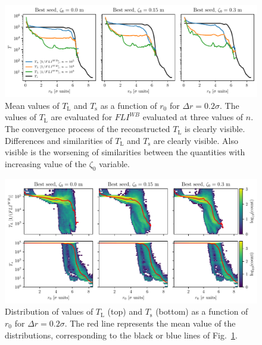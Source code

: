 \begin{figure}
    \centering
    \includegraphics[width=1\textwidth]{6_lhc_dynamic_indicators/figs/lyapunov_time_vs_radius.pdf}
    \caption{Mean values of $T_\mathrm{L}$ and $T_\mathrm{s}$ as a function of $r_0$ for $\Delta r = 0.2\sigma$. The values of $T_\mathrm{L}$ are evaluated for $FLI^{{WB}}$ evaluated at three values of $n$. The convergence process of the reconstructed $T_\mathrm{L}$ is clearly visible. Differences and similarities of $T_\mathrm{L}$ and $T_\mathrm{s}$ are clearly visible. Also visible is the worsening of similarities between the quantities with increasing value of the $\zeta_0$ variable. }
    \label{fig:ts_vs_tl}
\end{figure}

\begin{figure}
    \centering
    \includegraphics[width=1\textwidth]{6_lhc_dynamic_indicators/figs/dist_and_mean.pdf}
    \caption{Distribution of values of $T_\mathrm{L}$ (top) and $T_\mathrm{s}$ (bottom) as a function of $r_0$ for $\Delta r = 0.2\sigma$. The red line represents the mean value of the distributions, corresponding to the black or blue lines of Fig.~\ref{fig:ts_vs_tl}.}
    \label{fig:extra_distribution}
\end{figure}

